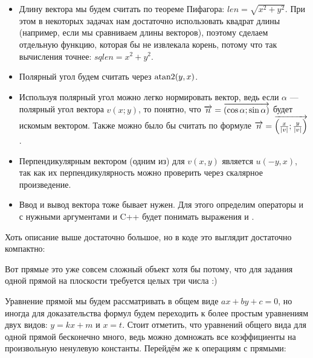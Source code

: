 \begin{itemize}
    \item Длину вектора мы будем считать по теореме Пифагора: $len = \sqrt{x^2 + y^2}$. При этом в некоторых задачах нам достаточно использовать квадрат длины (например, если мы сравниваем длины векторов), поэтому сделаем отдельную функцию, которая бы не извлекала корень, потому что так вычисления точнее: $sqlen = x^2 + y^2$.
    \item Полярный угол будем считать через $\operatorname{atan2}(y, x)$.
    \item Используя полярный угол можно легко нормировать вектор, ведь если $\alpha$ — полярный угол вектора $v(x; y)$, то понятно, что $\overrightarrow{n} = \overrightarrow{(\cos \alpha; \sin \alpha)}$ будет искомым вектором. Также можно было бы считать по формуле $\overrightarrow{n} = \overrightarrow{\left(\frac{x}{|v|}; \frac{y}{|v|}\right)}$.
    \item Перпендикулярным вектором (одним из) для $v(x, y)$ является $u(-y, x)$, так как их перпендикулярность можно проверить через скалярное произведение.
    \item Ввод и вывод вектора тоже бывает нужен. Для этого определим операторы \lcpp{>>} и \lcpp{<<} с нужными аргументами и C++ будет понимать выражения  и .
\end{itemize}

Хоть описание выше достаточно большое, но в коде это выглядит достаточно компактно:



Вот прямые это уже совсем сложный объект хотя бы потому, что для задания одной прямой на плоскости требуется целых три числа :)

Уравнение прямой мы будем рассматривать в общем виде $a x + b y + c = 0$, но иногда для доказательства формул будем переходить к более простым уравнениям двух видов: $y = k x + m$ и $x = t$. Стоит отметить, что уравнений общего вида для одной прямой бесконечно много, ведь можно домножать все коэффициенты на произвольную ненулевую константы. Перейдём же к операциям с прямыми:

